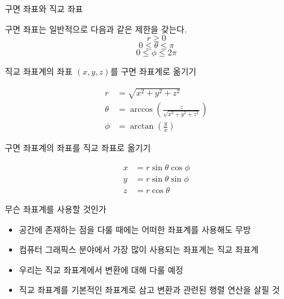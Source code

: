 \documentclass{beamer}
\begin{document}
\begin{frame}{구면 좌표와 직교 좌표}

{\small
구면 좌표는 일반적으로 다음과 같은 제한을 갖는다.
$$r \geq 0$$
$$0 \leq \theta \leq \pi$$
$$0 \leq \phi \leq 2 \pi $$

직교 좌표계의 좌표 $(x,y,z)$를 구면 좌표계로 옮기기

\begin{eqnarray}
r &= \sqrt{x^2 + y^2 + z^2} \nonumber \\
\theta & = \arccos \left ( \frac{z}{\sqrt{x^2 + y^2 + z^2}} \right ) \nonumber \\
\phi &= \arctan \left ( \frac{y}{x} \right ) \nonumber
\end{eqnarray}

구면 좌표계의 좌표를 직교 좌표로 옮기기

\begin{eqnarray}
x &= r \sin \theta \cos \phi \nonumber \\
y & = r \sin \theta \sin \phi \nonumber \\
z & =r \cos \theta \nonumber
\end{eqnarray}
}

\end{frame}

\begin{frame}{무슨 좌표계를 사용할 것인가}

\begin{itemize}
\item 공간에 존재하는 점을 다룰 때에는 어떠한 좌표계를 사용해도 무방
\item 컴퓨터 그래픽스 분야에서 가장 많이 사용되는 좌표계는 직교 좌표계
\item 우리는 직교 좌표계에서 변환에 대해 다룰 예정
\item 직교 좌표계를 기본적인 좌표계로 삼고 변환과 관련된 행렬 연산을 살필 것
\end{itemize}

\end{frame}
\end{document}
